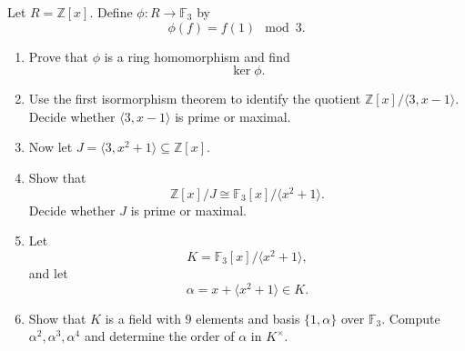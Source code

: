 \begin{prob}
    Let $R = \mathbb Z[x]$. 
    Define $\phi : R \to \mathbb F_3$ by 
    \[
        \phi(f) = f(1) \mod 3. 
    \]
    \begin{enumerate}
        \item Prove that $\phi$ is a ring 
            homomorphism and find 
            \[
                \ker \phi.
            \]
        \item Use the first isormorphism theorem 
            to identify the quotient 
            $\mathbb Z[x]/\langle 3, x-1 \rangle$.
            Decide whether $\langle 3, x-1 \rangle$ is 
            prime or maximal.
        \item[] Now let $J = \langle 3, x^2 + 1 \rangle 
            \subseteq \mathbb Z[x]$.
        \item Show that 
            \[
                \mathbb Z[x]/J \cong 
                \mathbb F_3[x]/\langle x^2 + 1 \rangle.
            \]
            Decide whether $J$ is prime or maximal.
        \item[] Let 
            \[
                K = \mathbb F_3[x]/\langle x^2 + 1\rangle,
            \]
            and let 
            \[
                \alpha = x + \langle x^2 + 1\rangle \in K.
            \]
        \item Show that $K$ is a field with $9$ 
            elements and basis $\{1,\alpha\}$ 
            over $\mathbb F_3$.
            Compute $\alpha^2, \alpha^3, \alpha^4$ and 
            determine the order of $\alpha$ in $K^\times$.
    \end{enumerate}
\end{prob}
